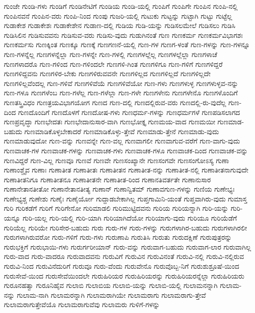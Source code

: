 {ಗುಂಜೇ
ಗುಂಡಿ-ಗಳು
ಗುಂಡಿಗೆ
ಗುಂಡಿನೇಟಿಗೆ
ಗುಂಡಿಯ
ಗುಂಡಿ-ಯಲ್ಲಿ
ಗುಂಪಿಗೆ
ಗುಂಪಿಗೇ
ಗುಂಪಿನ
ಗುಂಪಿ-ನಲ್ಲಿ
ಗುಂಪಿನವನೆ
ಗುಂಪಿನ-ವರು
ಗುಂಪಿ-ನಿಂದ
ಗುಂಪು
ಗುಜರಿ-ಯಲ್ಲಿ
ಗುಟುಕು
ಗುಟ್ಟನ್ನು
ಗುಟ್ಟಾಗಿ
ಗುಟ್ಟು
ಗುಟ್ಟೆಲ್ಲ
ಗುಡಾಕೇಶ
ಗುಡಾಕೇಶಃ
ಗುಡಾಕೇಶೇನ
ಗುಡಾಣ-ದಲ್ಲಿ
ಗುಡಿಯ
ಗುಡಿ-ಯನ್ನು
ಗುಡಿಸಲಮೇಲೆ
ಗುಡಿಸಲು
ಗುಡಿಸಿ
ಗುಡಿಸಿಲಿನ
ಗುಡಿಸುವವನು
ಗುಡಿಸುವ-ವರು
ಗುಡಿಸು-ವುದು
ಗುಡುಗಿನಂತೆ
ಗುಣ
ಗುಣಕರ್ಮ
ಗುಣಕರ್ಮವಿಭಾಗಶಃ
ಗುಣಕರ್ಮಸು
ಗುಣಕ್ಕಿಂತ
ಗುಣಕ್ಕೂ
ಗುಣಕ್ಕೆ
ಗುಣಗಣನೆ-ಯಲ್ಲಿ
ಗುಣ-ಗಳ
ಗುಣಗ-ಳಂತೆ
ಗುಣ-ಗಳನ್ನು
ಗುಣ-ಗಳನ್ನೂ
ಗುಣ-ಗಳನ್ನೆಲ್ಲ
ಗುಣಗಳನ್ನೆಲ್ಲಾ
ಗುಣ-ಗಳನ್ನೇ
ಗುಣ-ಗಳಲ್ಲಿ
ಗುಣಗಳಲ್ಲೆಲ್ಲ
ಗುಣಗಳಲ್ಲೆಲ್ಲಾ
ಗುಣಗಳಾಚೆ
ಗುಣಗಳಾದರೊ
ಗುಣ-ಗಳಿಂದ
ಗುಣ-ಗಳಿಂದಲೇ
ಗುಣಗಳಿ-ಗಿಂತ
ಗುಣಗಳಿಗೂ
ಗುಣ-ಗಳಿಗೆ
ಗುಣಗಳಿದ್ದರೆ
ಗುಣಗಳಿದ್ದವನು
ಗುಣಗಳಿರ-ಬೇಕು
ಗುಣಗಳಿರುವವನೇ
ಗುಣಗಳಿಲ್ಲದ
ಗುಣಗಳಿಲ್ಲದೆ
ಗುಣಗಳಿಲ್ಲದೇ
ಗುಣಗಳಿಲ್ಲವೆಂದಲ್ಲ
ಗುಣ-ಗಳಿವೆ
ಗುಣಗಳಿವೆಯೆ
ಗುಣಗಳಿವೆಯೋ
ಗುಣ-ಗಳು
ಗುಣಗಳುಳ್ಳ
ಗುಣಗಳುಳ್ಳವ-ನನ್ನು
ಗುಣ-ಗಳೂ
ಗುಣಗಳೆಂಬ
ಗುಣ-ಗಳೆಲ್ಲ
ಗುಣ-ಗಳೆಲ್ಲಾ
ಗುಣ-ಗಳೇ
ಗುಣಗಳೇನು
ಗುಣಗಳೇನೊ
ಗುಣಗಳೊಂದಿಗೆ
ಗುಣತಸ್ತ್ರಿವಿಧಂ
ಗುಣತ್ರಯವಿಭಾಗಯೋಗ
ಗುಣದ
ಗುಣ-ದಲ್ಲಿ
ಗುಣದಲ್ಲಿರುವ-ವರು
ಗುಣದಲ್ಲಿ-ರು-ವುದೆಲ್ಲ
ಗುಣ-ದಿಂದ
ಗುಣದೊಂದಿಗೆ
ಗುಣದೊಳಗೆ
ಗುಣದೋಷ-ಗಳು
ಗುಣಧರ್ಮ-ಗಳನ್ನು
ಗುಣಧರ್ಮಗಳೆ
ಗುಣಪಡಿಸಲಾಗದ
ಗುಣಪ್ರವೃದ್ಧಾ
ಗುಣಭೇದತಃ
ಗುಣಭೇದಾನುಸಾರ-ವಾಗಿ
ಗುಣಭೋಕ್ತೃ
ಗುಣಮಯ-ವಾದ
ಗುಣಮಯೀ
ಗುಣಮಾಡ-ಬಹುದು
ಗುಣಮಾಡಿಕೊಳ್ಳಬೇಕಾದರೆ
ಗುಣಮಾಡಿಕೊಳ್ಳು-ತ್ತೇವೆ
ಗುಣಮಾಡು-ತ್ತೇನೆ
ಗುಣಮಾಡು-ವುದು
ಗುಣಮಾಡುವುದೋ
ಗುಣ-ವನ್ನು
ಗುಣವನ್ನೇ
ಗುಣ-ವಲ್ಲ
ಗುಣವಾಗಲೀ
ಗುಣವಾಗುವ-ವರೆಗೆ
ಗುಣ-ವಾಗು-ವುದು
ಗುಣವಾಚಕ-ಗಳ
ಗುಣವಾಚಕ-ಗಳನ್ನು
ಗುಣವಾಚಕ-ಗಳು
ಗುಣವಾಚಕ-ಗಳೂ
ಗುಣವಾಚಕ-ದಿಂದ
ಗುಣವಾಚಕ-ವನ್ನು
ಗುಣವಿದ್ದರೆ
ಗುಣ-ವಿಲ್ಲ
ಗುಣವೂ
ಗುಣವೆ
ಗುಣವೇ
ಗುಣಸಂಖ್ಯಾನೇ
ಗುಣಸಂಗವೇ
ಗುಣಸಂಗೋಽಸ್ಯ
ಗುಣಾ
ಗುಣಾಂಶ್ಚೈವ
ಗುಣಾಃ
ಗುಣಾತೀತ
ಗುಣಾತೀತಃ
ಗುಣಾತೀತನ
ಗುಣಾತೀತ-ನನ್ನು
ಗುಣಾತೀತ-ನಲ್ಲಿ
ಗುಣಾತೀತನಾಗುವುದೇ
ಗುಣಾತೀತನಿಗೂ
ಗುಣಾತೀತನೂ
ಗುಣಾತೀತನೇ
ಗುಣಾತೀತ-ರಿಂದ
ಗುಣಾನತಿವರ್ತತೇ
ಗುಣಾನುಸಾರ
ಗುಣಾನೇತಾನತೀತೋ
ಗುಣಾನೇತಾನತೀತ್ಯ
ಗುಣಾನ್
ಗುಣಾನ್ವಿತಮ್
ಗುಣಾವಗುಣ-ಗಳನ್ನು
ಗುಣಿಯ
ಗುಣೇಭ್ಯಃ
ಗುಣೇಭ್ಯಶ್ಚ
ಗುಣೇಶು
ಗುಣೈಃ
ಗುಣೈರ್ಯೋ
ಗುದ್ದಾಡಬೇಕಾಗಿಲ್ಲ
ಗುಪ್ತಗಾಮಿನಿ-ಯಂತೆ
ಗುಪ್ತವಾಗಿರು-ವುದು
ಗುಮಾಸ್ತ
ಗುರಿ
ಗುರಿಕಡೆಗೆ
ಗುರಿಗೆ
ಗುರಿಗೇನೋ
ಗುರಿಮಾಡಲಿ
ಗುರಿಮುಟ್ಟಿದವನು
ಗುರಿಯ
ಗುರಿಯನ್ನಾಗಿ
ಗುರಿ-ಯನ್ನು
ಗುರಿ-ಯನ್ನೂ
ಗುರಿ-ಯಲ್ಲ
ಗುರಿ-ಯಲ್ಲಿ
ಗುರಿ-ಯಾಗಿ
ಗುರಿಯಾಗಿದೆಯೋ
ಗುರಿಯಾಗು-ವುದು
ಗುರಿಯೂ
ಗುರಿಯೆಡೆಗೆ
ಗುರಿಯೆಲ್ಲ
ಗುರಿಯೇ
ಗುರಿಸೇರ-ಬಹುದು
ಗುರು
ಗುರು-ಗಳ
ಗುರು-ಗಳನ್ನು
ಗುರುಗಳಾಗಿರ-ಬಹುದು
ಗುರುಗಳಾಗಿರಲೀ
ಗುರುಗಳಾಗಿರುವರೋ
ಗುರು-ಗಳಿಗೆ
ಗುರು-ಗಳು
ಗುರುಣಾಪಿ
ಗುರುತಿಸಿ
ಗುರುತು
ಗುರುದಕ್ಷಿಣೆ
ಗುರುಪುತ್ರರನ್ನು
ಗುರುಭಕ್ತಿಗೆ
ಗುರುಭಾಯಿ-ಗಳು
ಗುರುರ್ಗರೀಯಾನ್
ಗುರು-ವನ್ನು
ಗುರುವಾಗ-ಬಹುದು
ಗುರುವಾಗ-ಲಾರ
ಗುರುವಾಗಿಲ್ಲ
ಗುರು-ವಾದ
ಗುರು-ವಾದರೂ
ಗುರುವಾದವನು
ಗುರುವಿಗೆ
ಗುರುವಿನ
ಗುರುವಿನಂತೆ
ಗುರುವಿ-ನಲ್ಲಿ
ಗುರುವಿ-ನಲ್ಲಿರುವ
ಗುರುವಿ-ನಿಂದ
ಗುರುವಿನೆದುರಿಗೆ
ಗುರುವೂ
ಗುರು-ವೆಂದು
ಗುರುವೇನೊ
ಗುರುವೊಬ್ಬ-ನಿಗೆ
ಗುರುಶುಶ್ರೂಷೆ-ಯಿಂದ
ಗುರುಸೇವೆ-ಯಿಂದ
ಗುರುಸೇವೆಯಿಂದಲೇ
ಗುರುಹಿರಿಯರ
ಗುರುಹಿರಿಯರನ್ನು
ಗುರುಹಿರಿಯರನ್ನೆಲ್ಲಾ
ಗುರುಹಿರಿಯರು
ಗುರೂನಹತ್ವಾ
ಗುರೂನಿಹೈವ
ಗುಲಾಬಿ
ಗುಲಾಬಿಯ
ಗುಲಾಬಿ-ಯನ್ನು
ಗುಲಾಬಿ-ಯಲ್ಲಿ
ಗುಲಾಮನನ್ನಾಗಿ
ಗುಲಾಮ-ನನ್ನು
ಗುಲಾಮ-ನಾಗಿ
ಗುಲಾಮರನ್ನಾಗಿ
ಗುಲಾಮರಾಗಿಯೇ
ಗುಲಾಮರಾಗು
ಗುಲಾಮರಾಗು-ತ್ತೇವೆ
ಗುಲಾಮರಾಗುತ್ತೇವೆಯೊ
ಗುಲಾಮರಾಗುವೆವು
ಗುಲಾಮರು
ಗುಳಿಗೆ-ಗಳನ್ನು
}
